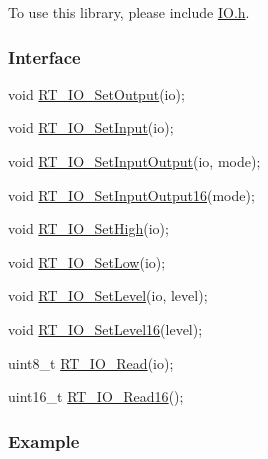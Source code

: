 To use this library, please include {\ttfamily \mbox{\hyperlink{a00050}{I\+O.\+h}}}.

\subsubsection*{Interface}


\begin{DoxyCode}
\textcolor{keywordtype}{void} \mbox{\hyperlink{a00050_a80f50c7de76076789b624b7fce7531c6}{RT\_IO\_SetOutput}}(io);

\textcolor{keywordtype}{void} \mbox{\hyperlink{a00050_ae333f1c232fdcb61b9e6ccaceeca2cec}{RT\_IO\_SetInput}}(io);

\textcolor{keywordtype}{void} \mbox{\hyperlink{a00050_ae845dc41cbf1b32b4d576373d1866d65}{RT\_IO\_SetInputOutput}}(io, mode);

\textcolor{keywordtype}{void} \mbox{\hyperlink{a00050_ade4bc867a36445fe0debc59cd5c9d9a5}{RT\_IO\_SetInputOutput16}}(mode);

\textcolor{keywordtype}{void} \mbox{\hyperlink{a00050_a752d981d1948aeae63c1a86070ae8e3a}{RT\_IO\_SetHigh}}(io);

\textcolor{keywordtype}{void} \mbox{\hyperlink{a00050_ae0e5eb1313d8307cf1362e997ee6f25e}{RT\_IO\_SetLow}}(io);

\textcolor{keywordtype}{void} \mbox{\hyperlink{a00050_a95fe40498ba314e1ea68aaa50335e7ef}{RT\_IO\_SetLevel}}(io, level);

\textcolor{keywordtype}{void} \mbox{\hyperlink{a00050_a5a3ae496ca3e12098c74c9f13b20c554}{RT\_IO\_SetLevel16}}(level);

uint8\_t \mbox{\hyperlink{a00050_aa69642c4177a35776090fdcf78d12e3b}{RT\_IO\_Read}}(io);

uint16\_t \mbox{\hyperlink{a00050_acf9c93d24ffeac5705da2c83ea2303d1}{RT\_IO\_Read16}}();
\end{DoxyCode}


\subsubsection*{Example}


